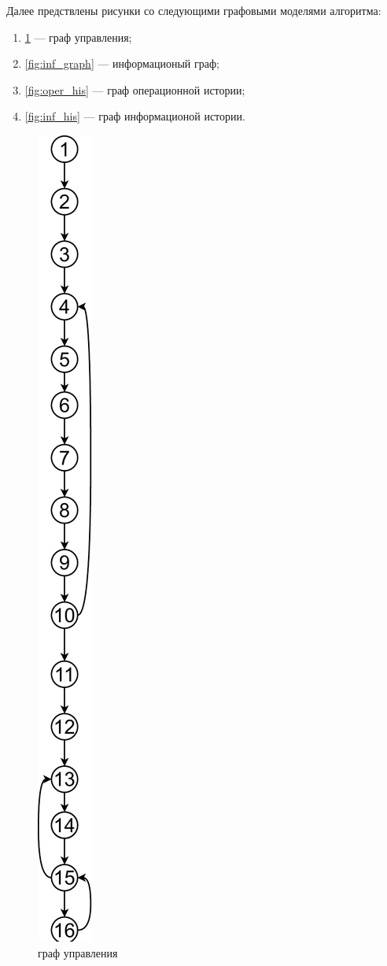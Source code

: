 Далее предствлены рисунки со следующими графовыми моделями алгоритма:
\begin{enumerate}[label=\arabic*)]
	\item \ref{fig:oper_graph} --- граф управления;
	\item \ref{fig:inf_graph} --- информационый граф;
	\item \ref{fig:oper_his} --- граф операционной истории;
	\item \ref{fig:inf_his} --- граф информационой истории.
\end{enumerate}

\begin{figure}[h!]
	\centering
	\includegraphics[width=0.1\linewidth]{img/gu}
	\caption{граф управления}
	\label{fig:oper_graph}
\end{figure}

